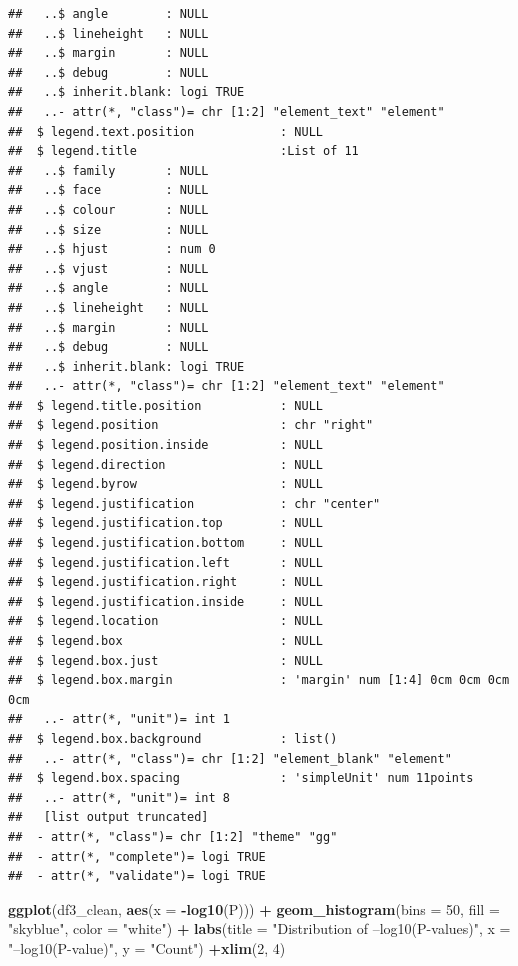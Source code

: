 \documentclass[
  12pt,
]{article}
\newenvironment{Shaded}{\begin{snugshade}}{\end{snugshade}}
\newcommand{\AttributeTok}[1]{\textcolor[rgb]{0.13,0.29,0.53}{#1}}
\newcommand{\DecValTok}[1]{\textcolor[rgb]{0.00,0.00,0.81}{#1}}
\newcommand{\FunctionTok}[1]{\textcolor[rgb]{0.13,0.29,0.53}{\textbf{#1}}}
\newcommand{\NormalTok}[1]{#1}
\newcommand{\SpecialCharTok}[1]{\textcolor[rgb]{0.81,0.36,0.00}{\textbf{#1}}}
\newcommand{\StringTok}[1]{\textcolor[rgb]{0.31,0.60,0.02}{#1}}
\begin{document}
\begin{verbatim}
##   ..$ angle        : NULL
##   ..$ lineheight   : NULL
##   ..$ margin       : NULL
##   ..$ debug        : NULL
##   ..$ inherit.blank: logi TRUE
##   ..- attr(*, "class")= chr [1:2] "element_text" "element"
##  $ legend.text.position            : NULL
##  $ legend.title                    :List of 11
##   ..$ family       : NULL
##   ..$ face         : NULL
##   ..$ colour       : NULL
##   ..$ size         : NULL
##   ..$ hjust        : num 0
##   ..$ vjust        : NULL
##   ..$ angle        : NULL
##   ..$ lineheight   : NULL
##   ..$ margin       : NULL
##   ..$ debug        : NULL
##   ..$ inherit.blank: logi TRUE
##   ..- attr(*, "class")= chr [1:2] "element_text" "element"
##  $ legend.title.position           : NULL
##  $ legend.position                 : chr "right"
##  $ legend.position.inside          : NULL
##  $ legend.direction                : NULL
##  $ legend.byrow                    : NULL
##  $ legend.justification            : chr "center"
##  $ legend.justification.top        : NULL
##  $ legend.justification.bottom     : NULL
##  $ legend.justification.left       : NULL
##  $ legend.justification.right      : NULL
##  $ legend.justification.inside     : NULL
##  $ legend.location                 : NULL
##  $ legend.box                      : NULL
##  $ legend.box.just                 : NULL
##  $ legend.box.margin               : 'margin' num [1:4] 0cm 0cm 0cm 0cm
##   ..- attr(*, "unit")= int 1
##  $ legend.box.background           : list()
##   ..- attr(*, "class")= chr [1:2] "element_blank" "element"
##  $ legend.box.spacing              : 'simpleUnit' num 11points
##   ..- attr(*, "unit")= int 8
##   [list output truncated]
##  - attr(*, "class")= chr [1:2] "theme" "gg"
##  - attr(*, "complete")= logi TRUE
##  - attr(*, "validate")= logi TRUE
\end{verbatim}

\begin{Shaded}
\begin{Highlighting}[]
\FunctionTok{ggplot}\NormalTok{(df3\_clean, }\FunctionTok{aes}\NormalTok{(}\AttributeTok{x =} \SpecialCharTok{{-}}\FunctionTok{log10}\NormalTok{(P))) }\SpecialCharTok{+}
  \FunctionTok{geom\_histogram}\NormalTok{(}\AttributeTok{bins =} \DecValTok{50}\NormalTok{, }\AttributeTok{fill =} \StringTok{"skyblue"}\NormalTok{, }\AttributeTok{color =} \StringTok{"white"}\NormalTok{) }\SpecialCharTok{+}
  \FunctionTok{labs}\NormalTok{(}\AttributeTok{title =} \StringTok{"Distribution of –log10(P{-}values)"}\NormalTok{,}
       \AttributeTok{x =} \StringTok{"–log10(P{-}value)"}\NormalTok{, }\AttributeTok{y =} \StringTok{"Count"}\NormalTok{) }\SpecialCharTok{+}\FunctionTok{xlim}\NormalTok{(}\DecValTok{2}\NormalTok{, }\DecValTok{4}\NormalTok{) }
\end{Highlighting}
\end{Shaded}
\end{document}
